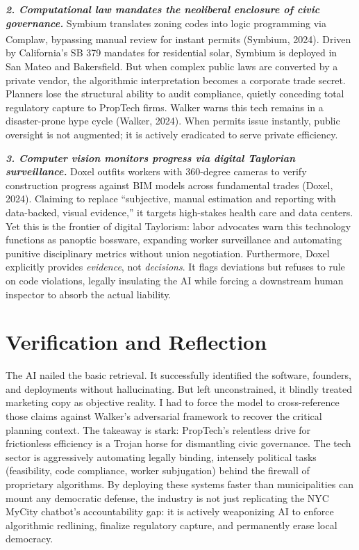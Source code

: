 \documentclass[11pt, twocolumn]{article}
\begin{document}
\textbf{\textit{2. Computational law mandates the neoliberal enclosure of civic governance.}}
Symbium translates zoning codes into logic programming via Complaw\textsuperscript{\textregistered}, bypassing manual review for instant permits (Symbium, 2024). Driven by California's SB 379 mandates for residential solar, Symbium is deployed in San Mateo and Bakersfield. But when complex public laws are converted by a private vendor, the algorithmic interpretation becomes a corporate trade secret. Planners lose the structural ability to audit compliance, quietly conceding total regulatory capture to PropTech firms. Walker warns this tech remains in a disaster-prone hype cycle (Walker, 2024). When permits issue instantly, public oversight is not augmented; it is actively eradicated to serve private efficiency.

\textbf{\textit{3. Computer vision monitors progress via digital Taylorian surveillance.}}
Doxel outfits workers with 360-degree cameras to verify construction progress against BIM models across fundamental trades (Doxel, 2024). Claiming to replace ``subjective, manual estimation and reporting with data-backed, visual evidence,'' it targets high-stakes health care and data centers. Yet this is the frontier of digital Taylorism: labor advocates warn this technology functions as panoptic bossware, expanding worker surveillance and automating punitive disciplinary metrics without union negotiation. Furthermore, Doxel explicitly provides \textit{evidence}, not \textit{decisions}. It flags deviations but refuses to rule on code violations, legally insulating the AI while forcing a downstream human inspector to absorb the actual liability.

\section*{Verification and Reflection}
The AI nailed the basic retrieval. It successfully identified the software, founders, and deployments without hallucinating. But left unconstrained, it blindly treated marketing copy as objective reality. I had to force the model to cross-reference those claims against Walker's adversarial framework to recover the critical planning context. The takeaway is stark: PropTech's relentless drive for frictionless efficiency is a Trojan horse for dismantling civic governance. The tech sector is aggressively automating legally binding, intensely political tasks (feasibility, code compliance, worker subjugation) behind the firewall of proprietary algorithms. By deploying these systems faster than municipalities can mount any democratic defense, the industry is not just replicating the NYC MyCity chatbot's accountability gap: it is actively weaponizing AI to enforce algorithmic redlining, finalize regulatory capture, and permanently erase local democracy.
\end{document}
